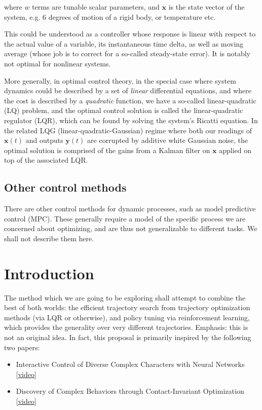 \documentclass{article}
\newcommand{\bvec}[1]{\boldsymbol{#1}}
\begin{document}
where $w$ terms are tunable scalar parameters, and $\bvec{x}$ is the state vector of the system, e.g. 6 degrees of motion of a rigid body, or temperature etc.

This could be understood as a controller whose response is linear with respect to the actual value of a variable, its instantaneous time delta, as well as moving average (whose job is to correct for a so-called steady-state error). It is notably not optimal for nonlinear systems.

More generally, in optimal control theory, in the special case where system dynamics could be described by a set of \textit{linear} differential equations, and where the cost is described by a \textit{quadratic} function, we have a so-called linear-quadratic (LQ) problem, and the optimal control solution is called the linear-quadratic regulator (LQR), which can be found by solving the system's Ricatti equation. In the related LQG (linear-quadratic-Gaussian) regime where both our readings of $\bvec{x}(t)$ and outputs $\bvec{y}(t)$ are corrupted by additive white Gaussian noise, the optimal solution is comprised of the gains from a Kalman filter on $\bvec{x}$ applied on top of the associated LQR.

\subsection{Other control methods}
There are other control methods for dynamic processes, such as model predictive control (MPC). These generally require a model of the specific process we are concerned about optimizing, and are thus not generalizable to different tasks. We shall not describe them here.

\section{Introduction}
The method which we are going to be exploring shall attempt to combine the best of both worlds: the efficient trajectory search from trajectory optimization methods (via LQR or otherwise), and policy tuning via reinforcement learning, which provides the generality over very different trajectories. Emphasis: this is not an original idea. In fact, this proposal is primarily inspired by the following two papers:

\begin{itemize}
	\item Interactive Control of Diverse Complex Characters with Neural Networks \cite{mordatch2015interactive} [\href{https://www.youtube.com/watch?v=57D-qgVX-6o}{video}]
	\item Discovery of Complex Behaviors through Contact-Invariant Optimization \cite{mordatch2012discovery} [\href{https://www.youtube.com/watch?v=mhr_jtQrhVA}{video}]
\end{itemize}
\end{document}
